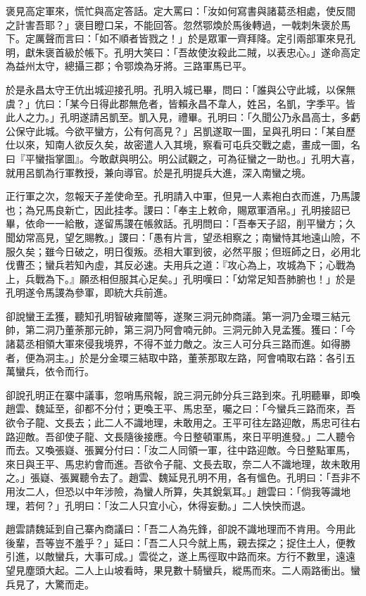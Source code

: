 褒見高定軍來，慌忙與高定答話。定大罵曰：「汝如何寫書與諸葛丞相處，使反間之計害吾耶？」褒目瞪口呆，不能回答。忽然鄂煥於馬後轉過，一戟刺朱褒於馬下。定厲聲而言曰：「如不順者皆戮之！」於是眾軍一齊拜降。定引兩部軍來見孔明，獻朱褒首級於帳下。孔明大笑曰：「吾故使汝殺此二賊，以表忠心。」遂命高定為益州太守，總攝三郡；令鄂煥為牙將。三路軍馬已平。

於是永昌太守王伉出城迎接孔明。孔明入城已畢，問曰：「誰與公守此城，以保無虞？」伉曰：「某今日得此郡無危者，皆賴永昌不韋人，姓呂，名凱，字季平。皆此人之力。」孔明遂請呂凱至。凱入見，禮畢。孔明曰：「久聞公乃永昌高士，多虧公保守此城。今欲平蠻方，公有何高見？」呂凱遂取一圖，呈與孔明曰：「某自歷仕以來，知南人欲反久矣，故密遣人入其境，察看可屯兵交戰之處，畫成一圖，名曰『平蠻指掌圖』。今敢獻與明公。明公試觀之，可為征蠻之一助也。」孔明大喜，就用呂凱為行軍教授，兼向導官。於是孔明提兵大進，深入南蠻之境。

正行軍之次，忽報天子差使命至。孔明請入中軍，但見一人素袍白衣而進，乃馬謖也；為兄馬良新亡，因此挂孝。謖曰：「奉主上敕命，賜眾軍酒帛。」孔明接詔已畢，依命一一給散，遂留馬謖在帳敘話。孔明問曰：「吾奉天子詔，削平蠻方；久聞幼常高見，望乞賜教。」謖曰：「愚有片言，望丞相察之；南蠻恃其地遠山險，不服久矣；雖今日破之，明日復叛。丞相大軍到彼，必然平服；但班師之日，必用北伐曹丕；蠻兵若知內虛，其反必速。夫用兵之道：『攻心為上，攻城為下；心戰為上，兵戰為下。』願丞相但服其心足矣。」孔明嘆曰：「幼常足知吾肺腑也！」於是孔明遂令馬謖為參軍，即統大兵前進。

卻說蠻王孟獲，聽知孔明智破雍闓等，遂聚三洞元帥商議。第一洞乃金環三結元帥，第二洞乃董荼那元帥，第三洞乃阿會喃元帥。三洞元帥入見孟獲。獲曰：「今諸葛丞相領大軍來侵我境界，不得不並力敵之。汝三人可分兵三路而進。如得勝者，便為洞主。」於是分金環三結取中路，董荼那取左路，阿會喃取右路：各引五萬蠻兵，依令而行。

卻說孔明正在寨中議事，忽哨馬飛報，說三洞元帥分兵三路到來。孔明聽畢，即喚趙雲、魏延至，卻都不分付；更喚王平、馬忠至，囑之曰：「今蠻兵三路而來，吾欲令子龍、文長去；此二人不識地理，未敢用之。王平可往左路迎敵，馬忠可往右路迎敵。吾卻使子龍、文長隨後接應。今日整頓軍馬，來日平明進發。」二人聽令而去。又喚張嶷、張翼分付曰：「汝二人同領一軍，往中路迎敵。今日整點軍馬，來日與王平、馬忠約會而進。吾欲令子龍、文長去取，奈二人不識地理，故未敢用之。」張嶷、張翼聽令去了。趙雲、魏延見孔明不用，各有慍色。孔明曰：「吾非不用汝二人，但恐以中年涉險，為蠻人所算，失其銳氣耳。」趙雲曰：「倘我等識地理，若何？」孔明曰：「汝二人只宜小心，休得妄動。」二人怏怏而退。

趙雲請魏延到自己寨內商議曰：「吾二人為先鋒，卻說不識地理而不肯用。今用此後輩，吾等豈不羞乎？」延曰：「吾二人只今就上馬，親去探之；捉住土人，便教引進，以敵蠻兵，大事可成。」雲從之，遂上馬徑取中路而來。方行不數里，遠遠望見塵頭大起。二人上山坡看時，果見數十騎蠻兵，縱馬而來。二人兩路衝出。蠻兵見了，大驚而走。

